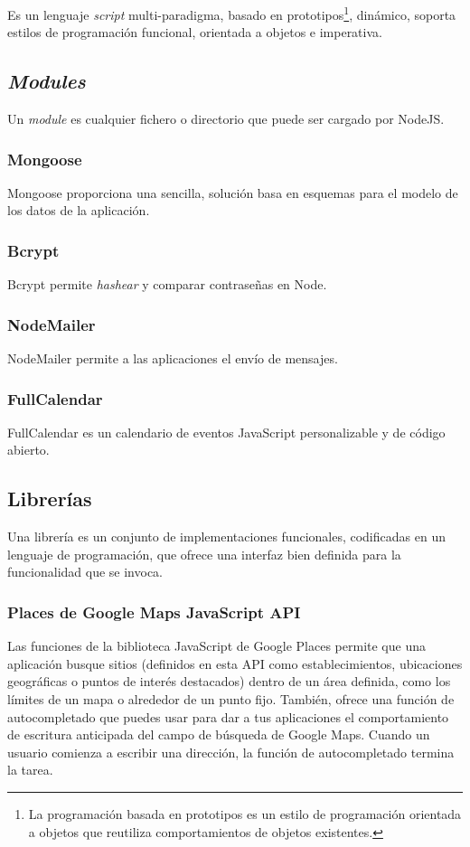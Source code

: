 Es un lenguaje \textit{script} multi-paradigma, basado en prototipos\footnote{La programación basada en prototipos es un estilo de programación orientada a objetos que reutiliza comportamientos de objetos existentes.}, dinámico, soporta estilos de programación funcional, orientada a objetos e imperativa\cite{javascript_mozilla}.


\subsection{	\textit{Modules}}
Un \textit{module} es cualquier fichero o directorio que puede ser cargado por NodeJS. 


\subsubsection{Mongoose}
Mongoose proporciona una sencilla, solución basa en esquemas para el modelo de los datos de la aplicación\cite{mongoose}.


\subsubsection{Bcrypt}
Bcrypt permite \textit{hashear} y comparar contraseñas en Node.


\subsubsection{NodeMailer}
NodeMailer permite a las aplicaciones el envío de mensajes.


\subsubsection{FullCalendar}
FullCalendar es un calendario de eventos JavaScript personalizable y de código abierto\cite{fullcalendar}.


\subsection{Librerías}
Una librería es un conjunto de implementaciones funcionales, codificadas en un lenguaje de programación, que ofrece una interfaz bien definida para la funcionalidad que se invoca.


\subsubsection{Places de Google Maps JavaScript API}
Las funciones de la biblioteca JavaScript de Google Places permite que una aplicación busque sitios (definidos en esta API como establecimientos, ubicaciones geográficas o puntos de interés destacados) dentro de un área definida, como los límites de un mapa o alrededor de un punto fijo. También, ofrece una función de autocompletado que puedes usar para dar a tus aplicaciones el comportamiento de escritura anticipada del campo de búsqueda de Google Maps. Cuando un usuario comienza a escribir una dirección, la función de autocompletado termina la tarea\cite{google_api}.


